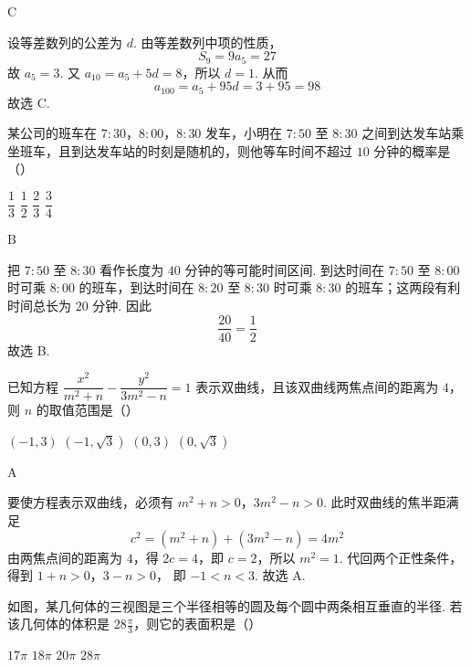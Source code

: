 \begin{answer}
C
\end{answer}

\begin{solution}
设等差数列的公差为 \(d\). 由等差数列中项的性质，
\[
S_9=9a_5=27
\]
故 \(a_5=3\). 又 \(a_{10}=a_5+5d=8\)，所以 \(d=1\). 从而
\[
a_{100}=a_5+95d=3+95=98
\]
故选 C.
\end{solution}



\begin{problem}
某公司的班车在 \(7{:}30\)，\(8{:}00\)，\(8{:}30\) 发车，小明在 \(7{:}50\) 至 \(8{:}30\) 之间到达发车站乘坐班车，且到达发车站的时刻是随机的，则他等车时间不超过 \(10\) 分钟的概率是（\quad）

\choices
    {\(\dfrac13\)}
    {\(\dfrac12\)}
    {\(\dfrac23\)}
    {\(\dfrac34\)}
\end{problem}

\begin{answer}
B
\end{answer}

\begin{solution}
把 \(7{:}50\) 至 \(8{:}30\) 看作长度为 \(40\) 分钟的等可能时间区间. 到达时间在 \(7{:}50\) 至 \(8{:}00\) 时可乘 \(8{:}00\) 的班车，到达时间在 \(8{:}20\) 至 \(8{:}30\) 时可乘 \(8{:}30\) 的班车；这两段有利时间总长为 \(20\) 分钟. 因此
\[
\frac{20}{40}=\frac12
\]
故选 B.
\end{solution}



\begin{problem}
已知方程 \(\dfrac{x^2}{m^2+n}-\dfrac{y^2}{3m^2-n}=1\) 表示双曲线，且该双曲线两焦点间的距离为 \(4\)，则 \(n\) 的取值范围是（\quad）

\choices
    {\((-1,3)\)}
    {\((-1,\sqrt3)\)}
    {\((0,3)\)}
    {\((0,\sqrt3)\)}
\end{problem}

\begin{answer}
A
\end{answer}

\begin{solution}
要使方程表示双曲线，必须有
\(m^2+n>0\)，\(3m^2-n>0\).
此时双曲线的焦半距满足
\[
c^2=(m^2+n)+(3m^2-n)=4m^2
\]
由两焦点间的距离为 \(4\)，得 \(2c=4\)，即 \(c=2\)，所以 \(m^2=1\). 代回两个正性条件，得到
\(1+n>0\)，\(3-n>0\)，
即 \(-1<n<3\). 故选 A.
\end{solution}



\begin{problem}
如图，某几何体的三视图是三个半径相等的圆及每个圆中两条相互垂直的半径. 若该几何体的体积是 \(28\frac{\pi}{3}\)，则它的表面积是（\quad）


\choices
    {\(17\pi\)}
    {\(18\pi\)}
    {\(20\pi\)}
    {\(28\pi\)}
\end{problem}


